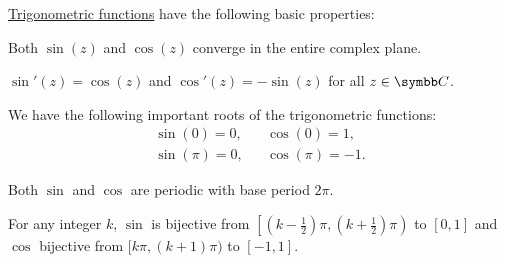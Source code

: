 \begin{proposition}\label{thm:trigonometric_function_properties}
  \hyperref[def:trigonometric_functions]{Trigonometric functions} have the following basic properties:
  \begin{PropEnum}
     Both \( \sin(z) \) and \( \cos(z) \) converge in the entire complex plane.

     \( \sin'(z) = \cos(z) \) and \( \cos'(z) = -\sin(z) \) for all \( z \in \BC \).

     We have the following important roots of the trigonometric functions:
    \begin{align}
      \sin(0) = 0,   &  & \cos(0) = 1,    \label{thm:trigonometric_function_properties/zeros/zero} \\
      \sin(\pi) = 0, &  & \cos(\pi) = -1. \label{thm:trigonometric_function_properties/zeros/pi}
    \end{align}

     Both \( \sin \) and \( \cos \) are periodic with base period \( 2\pi \).

     For any integer \( k \), \( \sin \) is bijective from \( \left[(k - \tfrac 1 2) \pi, (k + \tfrac 1 2) \pi \right) \) to \( [0, 1] \) and \( \cos \) bijective from \( [k\pi, (k + 1)\pi) \) to \( [-1, 1] \).
  \end{PropEnum}
\end{proposition}
